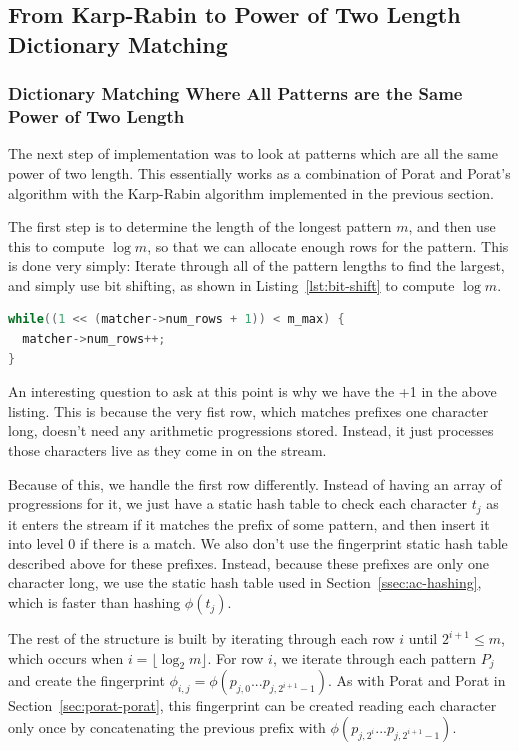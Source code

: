\documentclass[ %
                    author={Dominic Joseph Moylett},
                    degree={MEng},
                     title={Dictionary Matching with Fingerprints},
                  subtitle={An Empirical Analysis},
                      type={Research},
                      year={2014} ]{dissertation}
\begin{document}
\subsection{From Karp-Rabin to Power of Two Length Dictionary Matching}

\subsubsection{Dictionary Matching Where All Patterns are the Same Power of Two Length}

The next step of implementation was to look at patterns which are all the same power of two length. This essentially works as a combination of Porat and Porat's algorithm with the Karp-Rabin algorithm implemented in the previous section.

The first step is to determine the length of the longest pattern $m$, and then use this to compute $\log m$, so that we can allocate enough rows for the pattern. This is done very simply: Iterate through all of the pattern lengths to find the largest, and simply use bit shifting, as shown in Listing~\ref{lst:bit-shift} to compute $\log m$.

\begin{lstlisting}[float={t},caption={Computing $\log m$ via bit shifting.},label={lst:bit-shift},language=C]
while((1 << (matcher->num_rows + 1)) < m_max) {
  matcher->num_rows++;
}
\end{lstlisting}

An interesting question to ask at this point is why we have the +1 in the above listing. This is because the very fist row, which matches prefixes one character long, doesn't need any arithmetic progressions stored. Instead, it just processes those characters live as they come in on the stream.

Because of this, we handle the first row differently. Instead of having an array of progressions for it, we just have a static hash table to check each character $t_j$ as it enters the stream if it matches the prefix of some pattern, and then insert it into level 0 if there is a match. We also don't use the fingerprint static hash table described above for these prefixes. Instead, because these prefixes are only one character long, we use the static hash table used in Section~\ref{ssec:ac-hashing}, which is faster than hashing $\phi(t_j)$.

The rest of the structure is built by iterating through each row $i$ until $2^{i+1} \leq m$, which occurs when $i = \lfloor\log_2m\rfloor$. For row $i$, we iterate through each pattern $P_j$ and create the fingerprint $\phi_{i,j} = \phi(p_{j,0}...p_{j,2^{i + 1} - 1})$. As with Porat and Porat in Section~\ref{sec:porat-porat}, this fingerprint can be created reading each character only once by concatenating the previous prefix with $\phi(p_{j,2^{i}}...p_{j,2^{i + 1} - 1})$.
\end{document}
